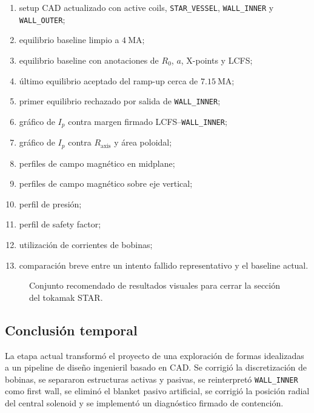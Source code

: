 \documentclass[11pt,a4paper]{article}
\begin{document}
\begin{enumerate}
    \item setup CAD actualizado con active coils, \texttt{STAR\_VESSEL}, \texttt{WALL\_INNER}
    y \texttt{WALL\_OUTER};
    \item equilibrio baseline limpio a $4~\mathrm{MA}$;
    \item equilibrio baseline con anotaciones de $R_0$, $a$, X-points y LCFS;
    \item último equilibrio aceptado del ramp-up cerca de $7.15~\mathrm{MA}$;
    \item primer equilibrio rechazado por salida de \texttt{WALL\_INNER};
    \item gráfico de $I_p$ contra margen firmado LCFS--\texttt{WALL\_INNER};
    \item gráfico de $I_p$ contra $R_{\mathrm{axis}}$ y área poloidal;
    \item perfiles de campo magnético en midplane;
    \item perfiles de campo magnético sobre eje vertical;
    \item perfil de presión;
    \item perfil de safety factor;
    \item utilización de corrientes de bobinas;
    \item comparación breve entre un intento fallido representativo y el baseline actual.
\end{enumerate}

\begin{figure}[htbp]
\centering
{}
\caption{Conjunto recomendado de resultados visuales para cerrar la sección del tokamak STAR.}
\label{fig:final_results_panel_placeholder}
\end{figure}

\subsection{Conclusión temporal}
La etapa actual transformó el proyecto de una exploración de formas idealizadas a un pipeline
de diseño ingenieril basado en CAD. Se corrigió la discretización de bobinas, se separaron
estructuras activas y pasivas, se reinterpretó \texttt{WALL\_INNER} como first wall, se eliminó
el blanket pasivo artificial, se corrigió la posición radial del central solenoid y se implementó
un diagnóstico firmado de contención.
\end{document}
